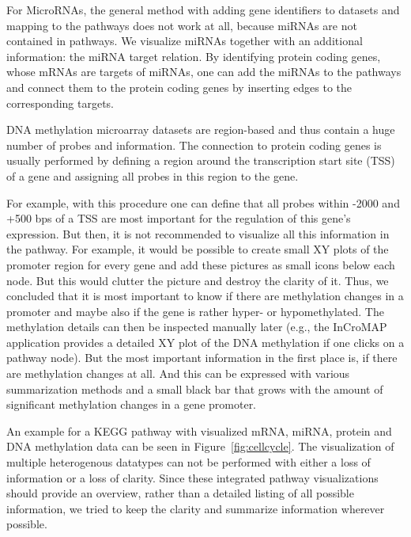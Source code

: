 \documentclass{bioinfo}
\begin{document}
For MicroRNAs, the general method with adding gene identifiers to datasets and mapping to the
pathways does not work at all, because miRNAs are not contained in pathways. We visualize miRNAs
together with an additional information: the miRNA target relation. By identifying protein coding
genes, whose mRNAs are targets of miRNAs, one can add the miRNAs to the pathways and connect them to
the protein coding genes by inserting edges to the corresponding targets.

DNA methylation microarray datasets are region-based and thus contain a huge number of probes and
information. The connection to protein coding genes is usually performed by defining a region around
the transcription start site (TSS) of a gene and assigning all probes in this region to the gene.

For example, with this procedure one can define that all probes within -2000 and +500 bps of a TSS
are most important for the regulation of this gene's expression.  But then, it is not recommended to
visualize all this information in the pathway. For example, it would be possible to create small XY
plots of the promoter region for every gene and add these pictures as small icons below each
node. But this would clutter the picture and destroy the clarity of it. Thus, we concluded that it
is most important to know if there are methylation changes in a promoter and maybe also if the gene
is rather hyper- or hypomethylated. The methylation details can then be inspected manually later
(e.g., the InCroMAP application provides a detailed XY plot of the DNA methylation if one clicks on
a pathway node). But the most important information in the first place is, if there are methylation
changes at all. And this can be expressed with various summarization methods and a small black bar
that grows with the amount of significant methylation changes in a gene promoter.

An example for a KEGG pathway with visualized mRNA, miRNA, protein and DNA methylation data can be
seen in Figure~\ref{fig:cellcycle}. The visualization of multiple heterogenous datatypes can not be
performed with either a loss of information or a loss of clarity. Since these integrated pathway
visualizations should provide an overview, rather than a detailed listing of all possible
information, we tried to keep the clarity and summarize information wherever possible.

\end{document}
